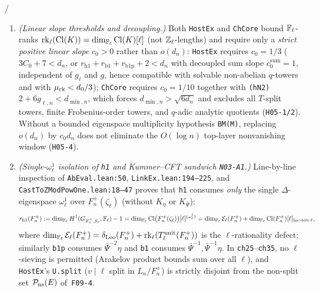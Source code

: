 \begin{theorem}\label{thm:6:hostex}
\tagProved{} / \tagObs{}
\begin{enumerate}[label=\textup{(\roman*)}]
\item \emph{(Linear slope thresholds and decoupling.)} Both \texttt{HostEx} and \texttt{ChCore} bound $\mathbb{F}_\ell$-ranks $\operatorname{rk}_\ell(\mathrm{Cl}(K)) = \dim_{\mathbb{F}_\ell}\mathrm{Cl}(K)[\ell]$ (not $\mathbb{Z}_\ell$-lengths) and require only a \emph{strict positive linear slope} $c_0 > 0$ rather than $o(d_n)$: \texttt{HostEx} requires $c_0 = 1/3$ ($3C_0 + 7 < d_n$, or $r_{\mathrm{h1}} + r_{\mathrm{b1}} + r_{\mathrm{b1p}} + 2 < d_n$ with decoupled sum slope $c_0^{\mathrm{sum}} = 1$, independent of $g_\ell$ and $g$, hence compatible with solvable non-abelian $q$-towers and with $\mu_{\operatorname{rk}} < d_0/3$); \texttt{ChCore} requires $c_0 = 1/10$ together with \texttt{(hN2)} $2 + 6 g_{\ell, n} < d_{\min, n}$, which forces $d_{\min, n} > \sqrt{6 d_n}$ and excludes all $T$-split towers, finite Frobenius-order towers, and $q$-adic analytic quotients (\texttt{H05-1/2}). Without a bounded eigenspace multiplicity hypothesis \texttt{BM(M)}, replacing $o(d_n)$ by $c_0 d_n$ does not eliminate the $O(\log n)$ top-layer nonvanishing window (\texttt{H05-4}).
\item \emph{(Single-$\omega_\ell^1$ isolation of \texttt{h1} and Kummer--CFT sandwich \texttt{N03-A1}.)} Line-by-line inspection of \texttt{AbEval.lean:50}, \texttt{LinkEx.lean:194--225}, and \texttt{CastToZModPowOne.lean:18--47} proves that \texttt{h1} consumes \emph{only} the single $\Delta$-eigenspace $\omega_\ell^1$ over $F_n^+(\zeta_\ell)$ (without $K_\eta$ or $K_{\bar\Psi}$):
\[
  r_{\mathrm{h1}}(F_n^+) := \dim_{\mathbb{F}_\ell} H^1(G_{F_n^+, S_\ell}, \mathbb{F}_\ell) - 1 = \dim_{\mathbb{F}_\ell} \mathrm{Cl}\bigl(F_n^+(\zeta_\ell)\bigr)[\ell]^{(\omega_\ell^1)} = \dim_{\mathbb{F}_\ell} \mathcal{E}_\ell(F_n^+) + \dim_{\mathbb{F}_\ell}\mathrm{Cl}(F_n^+)[\ell]_{\mathrm{loc}\text{-}\mathrm{triv}\,\ell},
\]
where $\dim_{\mathbb{F}_\ell}\mathcal{E}_\ell(F_n^+) = \delta_{\mathrm{Leo}}(F_n^+) + \operatorname{rk}_\ell(T_\ell^{\mathrm{unit}}(F_n^+))$ is the $\ell$-rationality defect; similarly \texttt{b1p} consumes $\bar\Psi^{-2}\eta$ and \texttt{b1} consumes $\bar\Psi^{-1}, \bar\Psi^{-1}\eta$. In \texttt{ch25}--\texttt{ch35}, no $\ell$-sieving is permitted (Arakelov product bounds sum over all $\ell$), and \texttt{HostEx}'s \texttt{U.split} ($v \mid \ell$ split in $L_n/F_n^+$) is strictly disjoint from the non-split set $\mathcal{P}_{\mathrm{ns}}(E)$ of~\texttt{F09-4}.

\end{enumerate}
\end{theorem}
